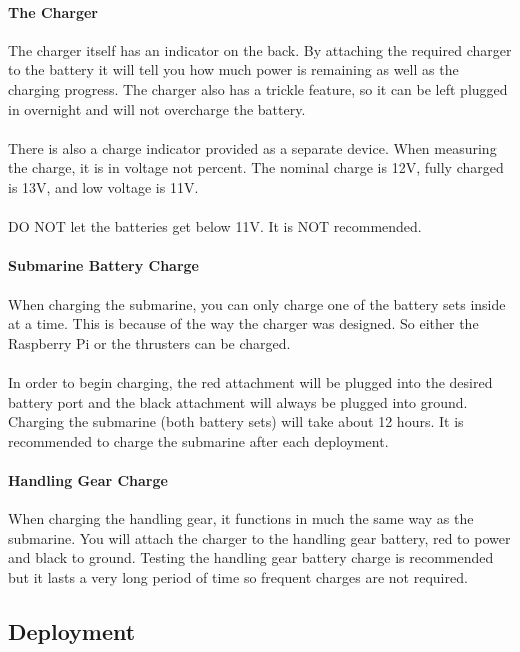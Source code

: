 \documentclass[
18pt, %
a4paper, %
oneside, %
headinclude,footinclude, %
]{scrartcl}
\begin{document}
\paragraph{The Charger}
The charger itself has an indicator on the back. By attaching the required charger to the battery it will tell you how much power is remaining as well as the charging progress. The charger also has a trickle feature, so it can be left plugged in overnight and will not overcharge the battery.\\ \\
There is also a charge indicator provided as a separate device. When measuring the charge, it is in voltage not percent. The nominal charge is 12V, fully charged is 13V, and low voltage is 11V. \\ \\
DO NOT let the batteries get below 11V. It is NOT recommended.

\paragraph{Submarine Battery Charge}
When charging the submarine, you can only charge one of the battery sets inside at a time. This is because of the way the charger was designed. So either the Raspberry Pi or the thrusters can be charged. \\ \\
In order to begin charging, the red attachment will be plugged into the desired battery port and the black attachment will always be plugged into ground. Charging the submarine (both battery sets) will take about 12 hours. It is recommended to charge the submarine after each deployment.

\paragraph{Handling Gear Charge}
When charging the handling gear, it functions in much the same way as the submarine. You will attach the charger to the handling gear battery, red to power and black to ground. Testing the handling gear battery charge is recommended but it lasts a very long period of time so frequent charges are not required.


\subsection{Deployment}
\end{document}

